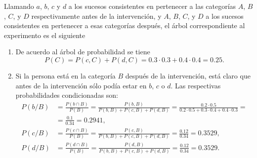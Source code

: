 {Llamando $a$, $b$, $c$ y $d$ a los sucesos consistentes en pertenecer a las categorías $A$, $B$, $C$, y $D$ respectivamente antes de la
intervención, y $A$, $B$, $C$, y $D$ a los sucesos consistentes en pertenecer a esas categorías después, el árbol correspondiente al experimento es el siguiente
\begin{center}
\renewcommand{\psedge}[2]{\ncdiag[armA=0.9cm,angleA=180,angleB=0,armB=0cm]{#2}{#1}} 
\end{center}


\begin{enumerate}
\item De acuerdo al árbol de probabilidad se tiene
\[
P(C) = P(c,C) + P(d,C) = 0.3 \cdot 0.3 + 0.4 \cdot 0.4 = 0.25.
\]

\item Si la persona está en la categoría $B$ después de la intervención, está claro que antes de la intervención sólo podía estar en $b$, $c$ o $d$. Las respectivas probabilidades condicionadas son:
\begin{align*}
P(b/B) &= \frac{P(b\cap B)}{P(B)} = \frac{P(b,B)}{P(b,B)+P(c,B)+P(d,B)} = \frac{0.2 \cdot 0.5}{0.2 \cdot 0.5+0.3 \cdot 0.4+0.4 \cdot 0.3} = \\
& = \frac{0.1}{0.34} = 0.2941,\\
P(c/B) &= \frac{P(c\cap B)}{P(B)} = \frac{P(c,B)}{P(b,B)+P(c,B)+P(d,B)} = \frac{0.12}{0.34} = 0.3529,\\
P(d/B) &= \frac{P(d\cap B)}{P(B)} = \frac{P(d,B)}{P(b,B)+P(c,B)+P(d,B)} = \frac{0.12}{0.34} = 0.3529.
\end{align*}


\end{enumerate}}
